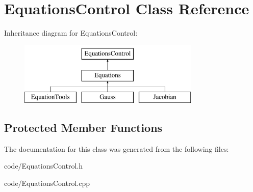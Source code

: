 \hypertarget{class_equations_control}{}\section{Equations\+Control Class Reference}
\label{class_equations_control}
Inheritance diagram for Equations\+Control\+:\begin{figure}[H]
\begin{center}
\leavevmode
\includegraphics[height=3.000000cm]{class_equations_control}
\end{center}
\end{figure}
\subsection*{Protected Member Functions}
\begin{DoxyCompactItemize}
\end{DoxyCompactItemize}


The documentation for this class was generated from the following files\+:\begin{DoxyCompactItemize}
\item 
code/Equations\+Control.\+h\item 
code/Equations\+Control.\+cpp\end{DoxyCompactItemize}
